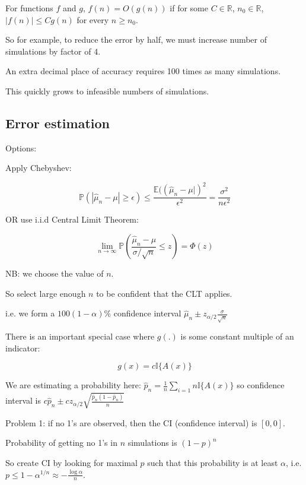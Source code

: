 \begin{definition}
	For functions $f$ and $g$, $f(n) = O(g(n))$ if for some $C \in \mathbb{R}$, $n_0 \in \mathbb{R}$, $|f(n)| \le C g(n)$ for every $n \ge n_0$.
\end{definition}

So for example, to reduce the error by half, we must increase number of simulations by factor of 4.

An extra decimal place of accuracy requires 100 times as many simulations.

This quickly grows to infeasible numbers of simulations.

\subsection{Error estimation}

Options:

Apply Chebyshev:

\[\mathbb{P}(|\hat{\mu}_n - \mu| \ge \epsilon) \le \frac{\mathbb{E}((\hat{\mu}_n - \mu|)^2}{\epsilon^2} = \frac{\sigma^2}{n \epsilon^2}\]

OR use i.i.d Central Limit Theorem:

\[\lim_{n \rightarrow \infty} \mathbb{P}(\frac{\hat{\mu}_n - \mu}{\sigma / \sqrt{n}} \le z) = \Phi (z)\]

NB: we choose the value of $n$.

So select large enough $n$ to be confident that the CLT applies.

i.e. we form a $100(1 - \alpha)\%$ confidence interval $\hat{\mu}_n \pm z_{\alpha / 2} \frac{\sigma}{\sqrt{n}}$

There is an important special case where $g(.)$ is some constant multiple of an indicator:

\[g(x) = c \mathbb{I} \{A(x)\}\]

We are estimating a probability here: $\hat{p}_n = \frac{1}{n} \sum_{i = 1}{n} \mathbb{I} \{ A(x) \}$ so confidence interval is $c\hat{p}_n \pm c z_{\alpha / 2} \sqrt{\frac{\hat{p}_n(1 - \hat{p}_n)}{n}}$

Problem 1: if no 1's are observed, then the CI (confidence interval) is $[0, 0]$.

Probability of getting no 1's in $n$ simulations is ${(1 - p)}^n$

So create CI by looking for maximal $p$ such that this probability is at least $\alpha$, i.e. $p \le 1 - \alpha^{1 / n} \approx -\frac{\log \alpha}{n}$.


